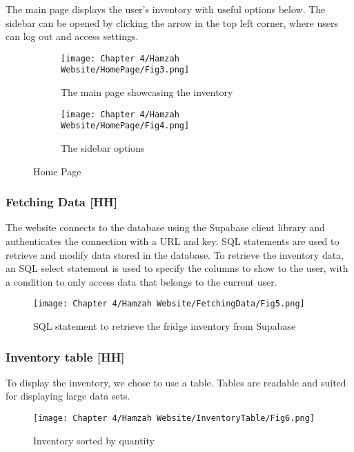 The main page displays the user's inventory with useful options below.
The sidebar can be opened by clicking the arrow in the top left corner, where users can log out and access settings.

\begin{figure}[H]
    \begin{subfigure}{.5\textwidth}
        \centering
        \texttt{[image: Chapter 4/Hamzah Website/HomePage/Fig3.png]}
        \caption{The main page showcasing the inventory}
    \end{subfigure}%
    \begin{subfigure}{.5\textwidth}
        \centering
        \texttt{[image: Chapter 4/Hamzah Website/HomePage/Fig4.png]}
        \caption{The sidebar options}
    \end{subfigure}
    \caption{Home Page}
\end{figure}

\subsubsection{Fetching Data [HH]}

The website connects to the database using the Supabase client library and authenticates the connection with a URL and key.
SQL statements are used to retrieve and modify data stored in the database.
To retrieve the inventory data, an SQL select statement is used to specify the columns to show to the user, with a condition to only access data that belongs to the current user.

\begin{figure}[H]        
    \centering
    \texttt{[image: Chapter 4/Hamzah Website/FetchingData/Fig5.png]}
    \caption{SQL statement to retrieve the fridge inventory from Supabase}
\end{figure} 

\subsubsection{Inventory table [HH]}

To display the inventory, we chose to use a table.
Tables are readable and suited for displaying large data sets.

\begin{figure}[H]        
    \centering
    \texttt{[image: Chapter 4/Hamzah Website/InventoryTable/Fig6.png]}
    \caption{Inventory sorted by quantity}
\end{figure} 

